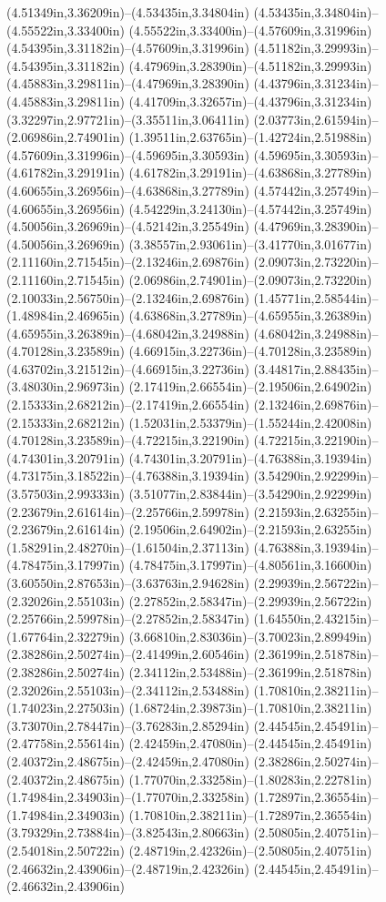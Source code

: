 (4.51349in,3.36209in)--(4.53435in,3.34804in) (4.53435in,3.34804in)--(4.55522in,3.33400in) (4.55522in,3.33400in)--(4.57609in,3.31996in) (4.54395in,3.31182in)--(4.57609in,3.31996in) (4.51182in,3.29993in)--(4.54395in,3.31182in) (4.47969in,3.28390in)--(4.51182in,3.29993in) (4.45883in,3.29811in)--(4.47969in,3.28390in) (4.43796in,3.31234in)--(4.45883in,3.29811in) (4.41709in,3.32657in)--(4.43796in,3.31234in) (3.32297in,2.97721in)--(3.35511in,3.06411in) (2.03773in,2.61594in)--(2.06986in,2.74901in) (1.39511in,2.63765in)--(1.42724in,2.51988in) (4.57609in,3.31996in)--(4.59695in,3.30593in) (4.59695in,3.30593in)--(4.61782in,3.29191in) (4.61782in,3.29191in)--(4.63868in,3.27789in) (4.60655in,3.26956in)--(4.63868in,3.27789in) (4.57442in,3.25749in)--(4.60655in,3.26956in) (4.54229in,3.24130in)--(4.57442in,3.25749in) (4.50056in,3.26969in)--(4.52142in,3.25549in) (4.47969in,3.28390in)--(4.50056in,3.26969in) (3.38557in,2.93061in)--(3.41770in,3.01677in) (2.11160in,2.71545in)--(2.13246in,2.69876in) (2.09073in,2.73220in)--(2.11160in,2.71545in) (2.06986in,2.74901in)--(2.09073in,2.73220in) (2.10033in,2.56750in)--(2.13246in,2.69876in) (1.45771in,2.58544in)--(1.48984in,2.46965in) (4.63868in,3.27789in)--(4.65955in,3.26389in) (4.65955in,3.26389in)--(4.68042in,3.24988in) (4.68042in,3.24988in)--(4.70128in,3.23589in) (4.66915in,3.22736in)--(4.70128in,3.23589in) (4.63702in,3.21512in)--(4.66915in,3.22736in) (3.44817in,2.88435in)--(3.48030in,2.96973in) (2.17419in,2.66554in)--(2.19506in,2.64902in) (2.15333in,2.68212in)--(2.17419in,2.66554in) (2.13246in,2.69876in)--(2.15333in,2.68212in) (1.52031in,2.53379in)--(1.55244in,2.42008in) (4.70128in,3.23589in)--(4.72215in,3.22190in) (4.72215in,3.22190in)--(4.74301in,3.20791in) (4.74301in,3.20791in)--(4.76388in,3.19394in) (4.73175in,3.18522in)--(4.76388in,3.19394in) (3.54290in,2.92299in)--(3.57503in,2.99333in) (3.51077in,2.83844in)--(3.54290in,2.92299in) (2.23679in,2.61614in)--(2.25766in,2.59978in) (2.21593in,2.63255in)--(2.23679in,2.61614in) (2.19506in,2.64902in)--(2.21593in,2.63255in) (1.58291in,2.48270in)--(1.61504in,2.37113in) (4.76388in,3.19394in)--(4.78475in,3.17997in) (4.78475in,3.17997in)--(4.80561in,3.16600in) (3.60550in,2.87653in)--(3.63763in,2.94628in) (2.29939in,2.56722in)--(2.32026in,2.55103in) (2.27852in,2.58347in)--(2.29939in,2.56722in) (2.25766in,2.59978in)--(2.27852in,2.58347in) (1.64550in,2.43215in)--(1.67764in,2.32279in) (3.66810in,2.83036in)--(3.70023in,2.89949in) (2.38286in,2.50274in)--(2.41499in,2.60546in) (2.36199in,2.51878in)--(2.38286in,2.50274in) (2.34112in,2.53488in)--(2.36199in,2.51878in) (2.32026in,2.55103in)--(2.34112in,2.53488in) (1.70810in,2.38211in)--(1.74023in,2.27503in) (1.68724in,2.39873in)--(1.70810in,2.38211in) (3.73070in,2.78447in)--(3.76283in,2.85294in) (2.44545in,2.45491in)--(2.47758in,2.55614in) (2.42459in,2.47080in)--(2.44545in,2.45491in) (2.40372in,2.48675in)--(2.42459in,2.47080in) (2.38286in,2.50274in)--(2.40372in,2.48675in) (1.77070in,2.33258in)--(1.80283in,2.22781in) (1.74984in,2.34903in)--(1.77070in,2.33258in) (1.72897in,2.36554in)--(1.74984in,2.34903in) (1.70810in,2.38211in)--(1.72897in,2.36554in) (3.79329in,2.73884in)--(3.82543in,2.80663in) (2.50805in,2.40751in)--(2.54018in,2.50722in) (2.48719in,2.42326in)--(2.50805in,2.40751in) (2.46632in,2.43906in)--(2.48719in,2.42326in) (2.44545in,2.45491in)--(2.46632in,2.43906in) 